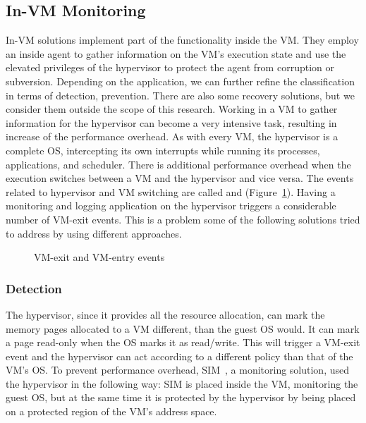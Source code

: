 \subsection{In-\ac{VM} Monitoring}\label{sub:invm}
In-\ac{VM} solutions implement part of the functionality inside the \ac{VM}. They employ an inside agent to gather information on the \ac{VM}'s execution state and use the elevated privileges of the hypervisor to protect the agent from corruption or subversion. Depending on the application, we can further refine the classification in terms of detection, prevention. There are also some recovery solutions, but we consider them outside the scope of this research. Working in a \ac{VM} to gather information for the hypervisor can become a very intensive task, resulting in increase of the performance overhead. As with every \ac{VM}, the hypervisor is a complete \ac{OS}, intercepting its own interrupts while running its processes, applications, and scheduler. There is additional performance overhead when the execution switches between a \ac{VM} and the hypervisor and vice versa. The events related to hypervisor and \ac{VM} switching are called  and  (Figure~\ref{fig:vmevents}). Having a monitoring and logging application on the hypervisor triggers a considerable number of VM-exit events. This is a problem some of the following solutions tried to address by using different approaches.

\begin{figure}[ht]
	\centering
	
	\caption{VM-exit and VM-entry events}
	\label{fig:vmevents}
\end{figure}

\subsubsection{Detection}

The hypervisor, since it provides all the resource allocation, can mark the memory pages allocated to a \ac{VM} different, than the guest \ac{OS} would. It can mark a page read-only when the \ac{OS} marks it as read/write. This will trigger a \ac{VM}-exit event and the hypervisor can act according to a different policy than that of the \ac{VM}’s \ac{OS}. To prevent performance overhead, SIM~\cite{sharif2009secure}, a monitoring solution,  used the hypervisor in the following way: SIM is placed inside the \ac{VM}, monitoring the guest \ac{OS}, but at the same time it is protected by the hypervisor by being placed on a protected region of the \ac{VM}’s address space. 

